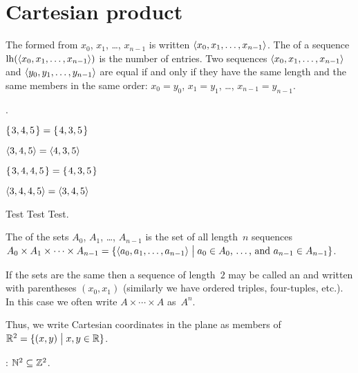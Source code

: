 \documentclass{ibl}
\begin{document}
\section{Cartesian product}

\begin{df}
The  
formed from $x_0$, $x_1$, \ldots, $x_{n-1}$ is written
$\langle x_0, x_1, \ldots, x_{n-1}\rangle$.
The  of a sequence $\operatorname*{lh}(\langle x_0, x_1, \ldots, x_{n-1}\rangle)$
is the number of entries.
Two sequences $\langle x_0, x_1, \ldots, x_{n-1}\rangle$ and
$\langle y_0, y_1, \ldots, y_{n-1}\rangle$ are equal if and only if
they have the same length and
the same members in the same order:
$x_0=y_0$, $x_1=y_1$, \ldots, $x_{n-1}=y_{n-1}$. 
\end{df}

\begin{ex}\pord.
\begin{exes}
\item $\mbox{$\{\hspace{0.1em}3, 4, 5\hspace{0.1em}\}$}=\mbox{$\{\hspace{0.1em}4, 3, 5\hspace{0.1em}\}$}$
\item $\langle3, 4, 5\rangle=\langle4, 3, 5\rangle$
\item $\mbox{$\{\hspace{0.1em}3, 4, 4, 5\hspace{0.1em}\}$}=\mbox{$\{\hspace{0.1em}4, 3, 5\hspace{0.1em}\}$}$
\item $\langle3, 4,4,5\rangle=\langle3,4,5\rangle$  
\end{exes}
\begin{ans}
 Test Test Test.
\end{ans}
\end{ex}

\begin{df}
The  of the sets $A_0$, $A_1$, \ldots, $A_{n-1}$ 
is the set of all length~$n$ sequences
$A_0\times A_1\times \cdots \times A_{n-1}
  =\{\langle a_0,a_1,\ldots,a_{n-1}\rangle \bigm| \text{$a_0\in A_0$, \ldots, and~$a_{n-1}\in A_{n-1}$}\}$.

If the sets are the same then 
a sequence of length~$2$ may be called an  and 
written with parentheses $(x_0,x_1)$
(similarly we have ordered triples, four-tuples, etc.).
In this case we often write $A\times\cdots\times A$ 
as~$A^n$.
\end{df}

Thus, we write 
Cartesian coordinates in the plane as members of
$\mathbb{R}^2=\{(x,y) \bigm| x,y\in\mathbb{R}\}$.

\begin{ex}
\pord:  $\mathbb{N}^2\subseteq \mathbb{Z}^2$.  
\end{ex}
\end{document}
